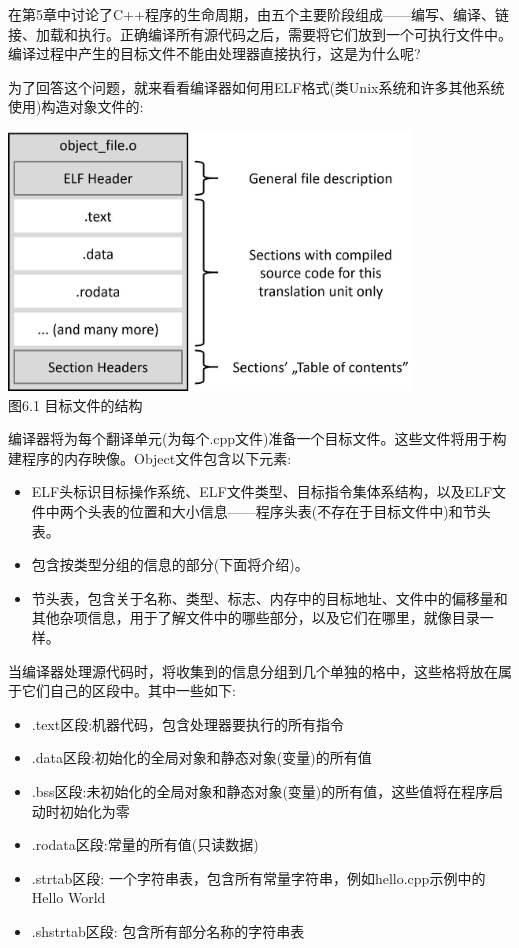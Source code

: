 在第5章中讨论了C++程序的生命周期，由五个主要阶段组成——编写、编译、链接、加载和执行。正确编译所有源代码之后，需要将它们放到一个可执行文件中。编译过程中产生的目标文件不能由处理器直接执行，这是为什么呢?

为了回答这个问题，就来看看编译器如何用ELF格式(类Unix系统和许多其他系统使用)构造对象文件的:

\begin{center}
\includegraphics[width=0.8\textwidth]{content/2/chapter6/images/1.jpg}\\
图6.1 目标文件的结构
\end{center}

编译器将为每个翻译单元(为每个.cpp文件)准备一个目标文件。这些文件将用于构建程序的内存映像。Object文件包含以下元素:

\begin{itemize}
\item 
ELF头标识目标操作系统、ELF文件类型、目标指令集体系结构，以及ELF文件中两个头表的位置和大小信息——程序头表(不存在于目标文件中)和节头表。

\item 
包含按类型分组的信息的部分(下面将介绍)。

\item 
节头表，包含关于名称、类型、标志、内存中的目标地址、文件中的偏移量和其他杂项信息，用于了解文件中的哪些部分，以及它们在哪里，就像目录一样。
\end{itemize}

当编译器处理源代码时，将收集到的信息分组到几个单独的格中，这些格将放在属于它们自己的区段中。其中一些如下:

\begin{itemize}
\item 
.text区段:机器代码，包含处理器要执行的所有指令

\item 
.data区段:初始化的全局对象和静态对象(变量)的所有值

\item 
.bss区段:未初始化的全局对象和静态对象(变量)的所有值，这些值将在程序启动时初始化为零

\item 
.rodata区段:常量的所有值(只读数据)

\item 
.strtab区段: 一个字符串表，包含所有常量字符串，例如hello.cpp示例中的Hello World

\item 
.shstrtab区段: 包含所有部分名称的字符串表
\end{itemize}

